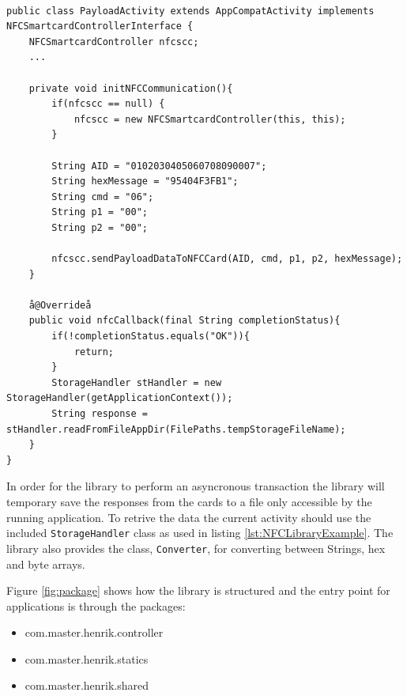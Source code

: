 \begin{lstlisting}[caption=Java code example showing how to send and receive commands to a NFC smart card., label=lst:NFCLibraryExample,escapechar=å]

public class PayloadActivity extends AppCompatActivity implements NFCSmartcardControllerInterface {
    NFCSmartcardController nfcscc;
    ...

    private void initNFCCommunication(){
        if(nfcscc == null) {
            nfcscc = new NFCSmartcardController(this, this);
        }

        String AID = "0102030405060708090007";
        String hexMessage = "95404F3FB1";
        String cmd = "06";
        String p1 = "00";
        String p2 = "00";

        nfcscc.sendPayloadDataToNFCCard(AID, cmd, p1, p2, hexMessage);
    }

    å@Overrideå
    public void nfcCallback(final String completionStatus){
        if(!completionStatus.equals("OK")){
            return;
        }
        StorageHandler stHandler = new StorageHandler(getApplicationContext());
        String response = stHandler.readFromFileAppDir(FilePaths.tempStorageFileName);
    }
}

\end{lstlisting}

In order for the library to perform an asyncronous transaction the library will temporary save the responses from the cards to a file only accessible by the running application. To retrive the data the current activity should use the included \texttt{StorageHandler} class as used in listing \ref{lst:NFCLibraryExample}. The library also provides the class, \texttt{Converter}, for converting between Strings, hex and byte arrays.

Figure \ref{fig:package} shows how the library is structured and the entry point for applications is through the packages:

\begin{itemize}
    \item com.master.henrik.controller
    \item com.master.henrik.statics
    \item com.master.henrik.shared
\end{itemize}



